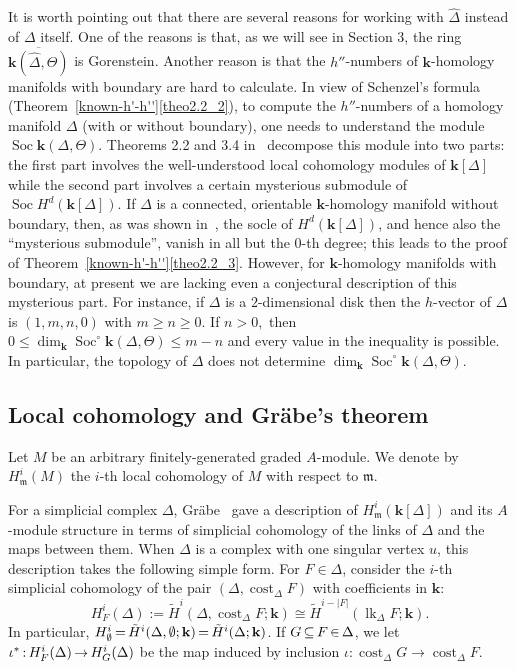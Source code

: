 \documentclass[10pt]{amsart}
\theoremstyle{definition}
\DeclareMathOperator\lk{lk}
\DeclareMathOperator\cost{cost}
\DeclareMathOperator{\Soc}{Soc}
\newcommand{\complet}[1]{\hat{#1}}
\newcommand{\field}{\mathbf{k}}
\newcommand{\mideal}{\ensuremath{\mathfrak{m}}}
\newcommand*{\Mk}{\mkern -2mu}
\begin{document}
 It is worth pointing out that there are several reasons for working with $\complet{\Delta}$ instead of $\Delta$ itself. One of the reasons is that, as we will see in Section 3, the ring $\overline{\field(\complet{\Delta},\Theta)}$ is Gorenstein. Another reason is that the $h''$-numbers of $\field$-homology manifolds with boundary are hard to calculate. In view of Schenzel's formula (Theorem~\ref{known-h'-h''}\eqref{theo2.2_2}), to compute the $h''$-numbers of a homology manifold $\Delta$ (with or without boundary), one needs to understand the module $\Soc \field(\Delta,\Theta)$. Theorems 2.2 and 3.4 in~\cite{Novik-Swartz-09:Socles} decompose this module into two parts: the first part involves the well-understood local cohomology modules of $\field[\Delta]$ while the second part involves a certain mysterious submodule of $\Soc H^d(\field[\Delta])$. If $\Delta$ is a connected, orientable $\field$-homology manifold without boundary, then, as was shown in~\cite[Theorem~2.1]{Novik-Swartz-09:Gorenstein}, the socle of $H^d(\field[\Delta])$, and hence also the ``mysterious submodule'', vanish in all but the $0$-th degree; this leads to the proof of Theorem~\ref{known-h'-h''}\eqref{theo2.2_3}. However, for $\field$-homology manifolds with boundary, at present we are lacking even a conjectural description of this mysterious part. For instance, if $\Delta$ is a $2$-dimensional disk then the $h$-vector of $\Delta$ is $(1,m,n,0)$ with $m \ge n \ge 0.$ If $n >0,$ then $0 \le \dim_\field \Soc^\circ \field(\Delta,\Theta) \le m-n$ and every value in the inequality is possible. In particular, the topology of $\Delta$ does not determine $\dim_\field \Soc^\circ \field (\Delta, \Theta).$


\subsection{Local cohomology and Gr{\"a}be's theorem}
Let $M$ be an arbitrary finitely-generated graded $A$-module. We denote by $H^i_\mideal(M)$ the $i$-th local cohomology of $M$ with respect to $\mideal$. 

For a simplicial complex $\Delta$, Gr{\"a}be~\cite{Grabe-84} gave a description of $H^i_\mideal(\field[\Delta])$ and its $A$-module structure in terms of simplicial cohomology of the links of $\Delta$ and the maps between them. When $\Delta$ is a complex with one singular vertex $u$, this description takes the following simple form. For $F\in\Delta$, consider the $i$-th simplicial cohomology of the pair $(\Delta, \cost_\Delta F)$ with coefficients in $\field$:
\[
H^i_F(\Delta):=\tilde{H}^i(\Delta, \cost_\Delta F; \field)\cong \tilde{H}^{i-|F|}(\lk_\Delta F; \field). \]
In particular, $H^i_\emptyset\Mk =\Mk \tilde{H}^i(\Delta, \emptyset;\field)\Mk =\Mk \tilde{H}^i(\Delta; \field)$. If $G\Mk \subseteq \Mk F\Mk \in\Mk \Delta$, we let $\iota^\ast\Mk :\Mk  H^i_F(\Delta)\Mk \to\Mk  H^i_G(\Delta)$ be the map induced by inclusion $\iota: \cost_\Delta G \to \cost_\Delta F$.
\end{document}
